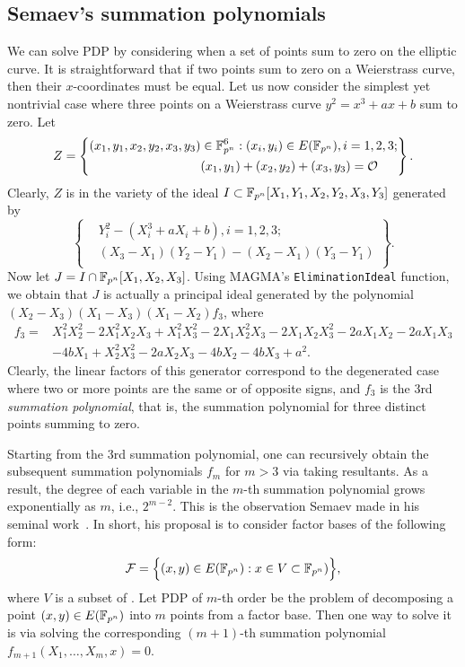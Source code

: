 \subsection{Semaev's summation polynomials}
%
\label{sec:summation-polynomial}
%
We can solve PDP by considering when a set of points sum to zero on
the elliptic curve.
%
It is straightforward that if two points sum to zero on a Weierstrass
curve, then their $x$-coordinates must be equal.
%
Let us now consider the simplest yet nontrivial case where three
points on a Weierstrass curve $y^2=x^3+ax+b$ sum to zero.
%
Let
\[ Z=\left\{\begin{aligned}
      (x_1,y_1,x_2,y_2,x_3,y_3)&\in\mathbb F_{p^n}^6:(x_i,y_i)\in E(\mathbb F_{p^n}),i=1,2,3; \\
      & (x_1,y_1)+(x_2,y_2)+(x_3,y_3)=\mathcal O
    \end{aligned} \right\}. \]
%
Clearly, $Z$ is in the variety of the ideal
$I\subset\mathbb F_{p^n}[X_1,Y_1,X_2,Y_2,X_3,Y_3]$ generated by
\[ \left\{\begin{aligned}
      & Y_i^2 - (X_i^3 + aX_i + b),i=1,2,3; \\
      &  (X_3 - X_1)(Y_2 - Y_1) - (X_2 - X_1)(Y_3 - Y_1)\\
    \end{aligned}\right\}. \]
%
Now let $J=I\cap\mathbb F_{p^n}[X_1,X_2,X_3]$.
%
Using MAGMA's \texttt{EliminationIdeal} function, we obtain that $J$
is actually a principal ideal generated by the polynomial
$(X_2 - X_3)(X_1 - X_3)(X_1 - X_2)f_3$, where
%
\begin{align*}
  f_3 = & X_1^2X_2^2 - 2X_1^2X_2X_3 + X_1^2X_3^2 - 2X_1X_2^2X_3 - 2X_1X_2X_3^2 - 2aX_1X_2 - 2aX_1X_3 \\
        & - 4bX_1 + X_2^2X_3^2 - 2aX_2X_3 - 4bX_2 - 4bX_3 + a^2.
\end{align*}
%
Clearly, the linear factors of this generator correspond to the
degenerated case where two or more points are the same or of opposite
signs, and $f_3$ is the 3rd \emph{summation polynomial}, that is, the
summation polynomial for three distinct points summing to zero.

Starting from the 3rd summation polynomial, one can recursively obtain
the subsequent summation polynomials $f_m$ for $m>3$ via taking
resultants.
%
As a result, the degree of each variable in the $m$-th summation
polynomial grows exponentially as $m$, i.e., $2^{m-2}$.
%
This is the observation Semaev made in his seminal
work~\cite{DBLP:journals/iacr/Semaev04}.
%
In short, his proposal is to consider factor bases of the following
form:
\[ \mathcal F=\Big\{(x,y)\in E(\mathbb F_{p^n}):x\in
  V\subset\mathbb F_{p^n})\Big\}, \] where $V$ is a subset of .
%
Let PDP of $m$-th order be the problem of decomposing a point
$(x,y)\in E(\mathbb F_{p^n})$ into $m$ points from a factor base.
%
Then one way to solve it is via solving the corresponding $(m+1)$-th
summation polynomial $f_{m+1}(X_1,\ldots,X_m,x)=0$.

